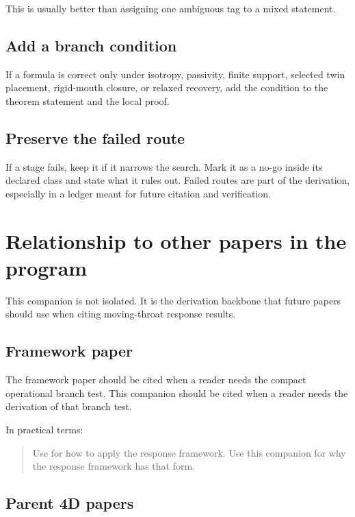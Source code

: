 This is usually better than assigning one ambiguous tag to a mixed statement.

\subsection{Add a branch condition}
\label{subsec:add-branch-condition}

If a formula is correct only under isotropy, passivity, finite support, selected twin placement, rigid-mouth closure, or relaxed recovery, add the condition to the theorem statement and the local proof.

\subsection{Preserve the failed route}
\label{subsec:preserve-failed-route}

If a stage fails, keep it if it narrows the search.  Mark it as a no-go inside its declared class and state what it rules out.  Failed routes are part of the derivation, especially in a ledger meant for future citation and verification.

\section{Relationship to other papers in the program}
\label{sec:relationship-to-other-papers}

This companion is not isolated.  It is the derivation backbone that future papers should use when citing moving-throat response results.

\subsection{Framework paper}
\label{subsec:relationship-framework-paper}

The framework paper should be cited when a reader needs the compact operational branch test.  This companion should be cited when a reader needs the derivation of that branch test.

In practical terms:
\begin{quote}
Use  for how to apply the response framework.  Use this companion for why the response framework has that form.
\end{quote}

\subsection{Parent 4D papers}
\label{subsec:relationship-parent-papers}

